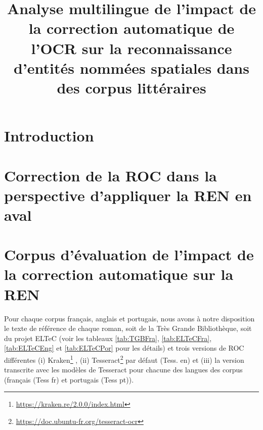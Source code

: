 \documentclass[utf8x]{article-hermes_frenchb}
\title[Contamination des OCR sur la REN]{Analyse multilingue de l'impact de la correction automatique de l'OCR sur la reconnaissance d’entités nommées spatiales dans des corpus littéraires}
\begin{document}
\maketitlepage

\newcommand{\fakesentence}{Attention à ce que les figures et les tableaux ne débordent pas dans les marges. }
\newcommand{\fakeparagraph}{
\fakesentence
\fakesentence
\fakesentence
\fakesentence
\fakesentence
\fakesentence
}

\newcommand{\TAL}{traitement automatique des langues}

\newcommand{\CAD}{c'est-à-dire}
\newcommand{\COLL}{et collègues}
\newcommand{\PEX}{par exemple}
\newcommand{\POPP}{par opposition à}

\newcommand{\cad}{c.-à-d.}
\newcommand{\coll}{et~coll.}
\newcommand{\pex}{p.~ex.}
\newcommand{\popp}{p.~opp.}

\section{Introduction}




\section{Correction de la ROC dans la perspective d'appliquer la REN en aval}

\label{sec:sota}

\section{Corpus d'évaluation de l'impact de la correction automatique sur la REN}
\label{sec:data}
Pour chaque corpus français, anglais et portugais, nous avons à notre disposition le texte de référence de chaque roman, soit de la Très Grande Bibliothèque, soit du projet ELTeC (voir les tableaux  \ref{tab:TGBFra}, \ref{tab:ELTeCFra}, \ref{tab:ELTeCEng} et \ref{tab:ELTeCPor} pour les détails) et trois versions de ROC différentes (i) Kraken\footnote{\url{https://kraken.re/2.0.0/index.html}} \cite{kiessling2019escriptorium}, (ii) Tesseract\footnote{ \url{https://doc.ubuntu-fr.org/tesseract-ocr}} par défaut (Tess. en) et (iii) la version transcrite avec les modèles de Tesseract pour chacune des langues des corpus (français (Tess fr) et portugais (Tess pt)). 

\end{document}
